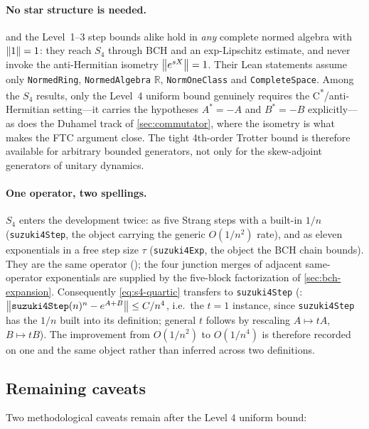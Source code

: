 \paragraph{No star structure is needed.}
 and the Level~1--3 step bounds alike hold in \emph{any}
complete normed algebra with $\left\|1\right\| = 1$: they reach $S_4$ through BCH and
an exp-Lipschitz estimate, and never invoke the anti-Hermitian isometry
$\left\|e^{sX}\right\| = 1$. Their Lean statements assume only \texttt{NormedRing},
\texttt{NormedAlgebra} $\mathbb{R}$, \texttt{NormOneClass} and
\texttt{CompleteSpace}. Among the $S_4$ results, only the Level~4 uniform bound
genuinely requires the C\textsuperscript{*}/anti-Hermitian setting---it carries
the hypotheses $A^* = -A$ and $B^* = -B$ explicitly---as does the Duhamel track
of \cref{sec:commutator}, where the isometry is what makes the FTC argument
close. The tight 4th-order Trotter bound is therefore available for arbitrary
bounded generators, not only for the skew-adjoint generators of unitary
dynamics.

\paragraph{One operator, two spellings.}
$S_4$ enters the development twice: as five Strang steps with a built-in $1/n$
(\texttt{suzuki4Step}, the object carrying the generic $O(1/n^2)$ rate), and as
eleven exponentials in a free step size $\tau$ (\texttt{suzuki4Exp}, the object
the BCH chain bounds). They are the same operator
(); the four
junction merges of adjacent same-operator exponentials are supplied by the
five-block factorization of \cref{sec:bch-expansion}. Consequently
\eqref{eq:s4-quartic} transfers to \texttt{suzuki4Step}
(:
$\left\|\texttt{suzuki4Step}(n)^n - e^{A+B}\right\| \le C/n^4$, i.e.\ the $t = 1$
instance, since \texttt{suzuki4Step} has the $1/n$ built into its definition;
general $t$ follows by rescaling $A \mapsto tA$, $B \mapsto tB$). The
improvement from $O(1/n^2)$ to $O(1/n^4)$ is therefore recorded on one and the
same object rather than inferred across two definitions.

\subsection{Remaining caveats}
\label{sec:caveats}

Two methodological caveats remain after the Level 4 uniform bound:

